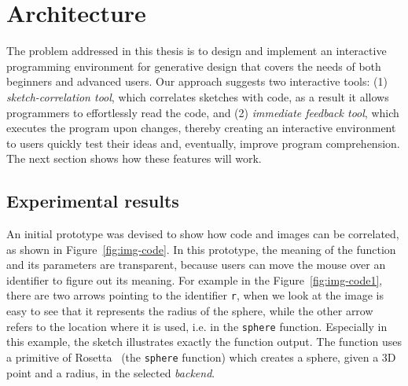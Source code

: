 
% 
% 

\section{Architecture}
\label{sec:arch}

The problem addressed in this thesis is to design and implement an interactive programming environment for generative design that covers the needs of both beginners and advanced users. Our approach suggests two interactive tools: (1) \textit{sketch-correlation tool}, which correlates sketches with code, as a result it allows programmers to effortlessly read the code, and (2) \textit{immediate feedback tool}, which executes the program upon changes, thereby creating an interactive environment to users quickly test their ideas and, eventually, improve program comprehension. The next section shows how these features will work.

\subsection{Experimental results}

An initial prototype was devised to show how code and images can be correlated, as shown in Figure~\ref{fig:img-code}. In this prototype, the meaning of the function and its parameters are transparent, because users can move the mouse over an identifier to figure out its meaning. For example in the Figure~\ref{fig:img-code1}, there are two arrows pointing to the identifier \texttt{r}, when we look at the image is easy to see that it represents the radius of the sphere, while the other arrow refers to the location where it is used, i.e. in the \texttt{sphere} function. Especially in this example, the sketch illustrates exactly the function output. The function uses a primitive of Rosetta~\cite{lopes2011portable} (the \texttt{sphere} function) which creates a sphere, given a 3D point and a radius, in the selected \textit{backend}.

